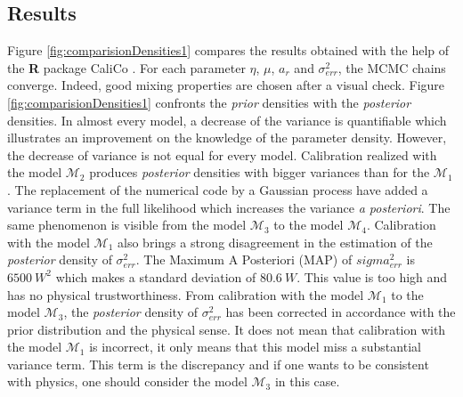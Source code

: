 \documentclass[soumission]{jsfds}
\begin{document}
\subsection{Results}


Figure \ref{fig:comparisionDensities1} compares the results obtained with the help of the \textbf{R} package CaliCo \citep{CaliCo}. For each parameter $\eta$, $\mu$, $a_r$ and $\sigma_{err}^2$, the MCMC chains converge. Indeed, good mixing properties are chosen after a visual check. Figure \ref{fig:comparisionDensities1} confronts the \textit{prior} densities with the \textit{posterior} densities. In almost every model, a decrease of the variance is quantifiable which illustrates an improvement on the knowledge of the parameter density. However, the decrease of variance is not equal for every model. Calibration realized with the model $\mathcal{M}_2$ produces \textit{posterior} densities with bigger variances than for the $\mathcal{M}_1$. The replacement of the numerical code by a Gaussian process have added a variance term in the full likelihood which increases the variance \textit{a posteriori}. The same phenomenon is visible from the model $\mathcal{M}_3$ to the model $\mathcal{M}_4$. Calibration with the model $\mathcal{M}_1$ also brings a strong disagreement in the estimation of the \textit{posterior} density of $\sigma_{err}^2$. The Maximum A Posteriori (MAP) of $sigma_{err}^2$ is $6500\ W^2$ which makes a standard deviation of $80.6\ W$. This value is too high and has no physical trustworthiness. From calibration with the model $\mathcal{M}_1$ to the model $\mathcal{M}_3$, the \textit{posterior} density of $\sigma_{err}^2$ has been corrected in accordance with the prior distribution and the physical sense. It does not mean that calibration with the model $\mathcal{M}_1$ is incorrect, it only means that this model miss a substantial variance term. This term is the discrepancy and if one wants to be consistent with physics, one should consider the model $\mathcal{M}_3$ in this case.\newline
\end{document}
